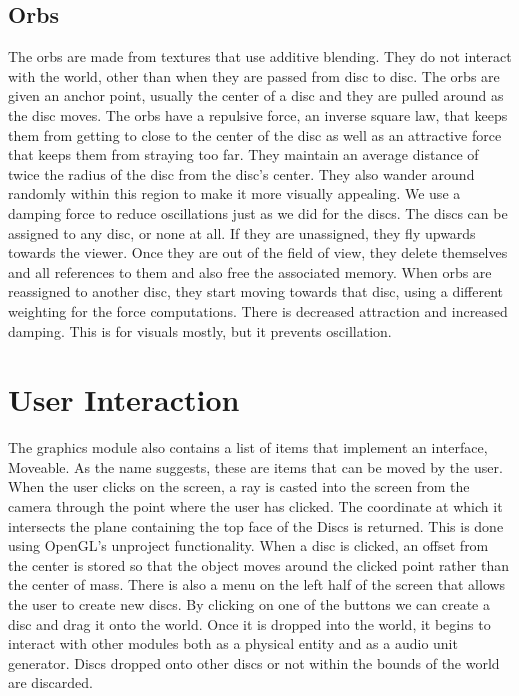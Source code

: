 \documentclass[pdftext,twoside,10pt]{article}
\begin{document}
\subsection{Orbs}
The orbs are made from textures that use additive blending. They do not interact with the world, other than when they are passed from disc to disc. The orbs are given an anchor point, usually the center of a disc and they are pulled around as the disc moves. The orbs have a repulsive force, an inverse square law, that keeps them from getting to close to the center of the disc as well as an attractive force that keeps them from straying too far. They maintain an average distance of twice the radius of the disc from the disc's center. They also wander around randomly within this region to make it more visually appealing. We use a damping force to reduce oscillations just as we did for the discs. The discs can be assigned to any disc, or none at all. If they are unassigned, they fly upwards towards the viewer. Once they are out of the field of view, they delete themselves and all references to them and also free the associated memory. When orbs are reassigned to another disc, they start moving towards that disc, using a different weighting for the force computations. There is decreased attraction and increased damping. This is for visuals mostly, but it prevents oscillation.

\section{User Interaction}
The graphics module also contains a list of items that implement an interface, Moveable. As the name suggests, these are items that can be moved by the user. When the user clicks on the screen, a ray is casted into the screen from the camera through the point where the user has clicked. The coordinate at which it intersects the plane containing the top face of the Discs is returned. This is done using OpenGL's unproject functionality. When a disc is clicked, an offset from the center is stored so that the object moves around the clicked point rather than the center of mass. There is also a menu on the left half of the screen that allows the user to create new discs. By clicking on one of the buttons we can create a disc and drag it onto the world. Once it is dropped into the world, it begins to interact with other modules both as a physical entity and as a audio unit generator. Discs dropped onto other discs or not within the bounds of the world are discarded.
\end{document}
